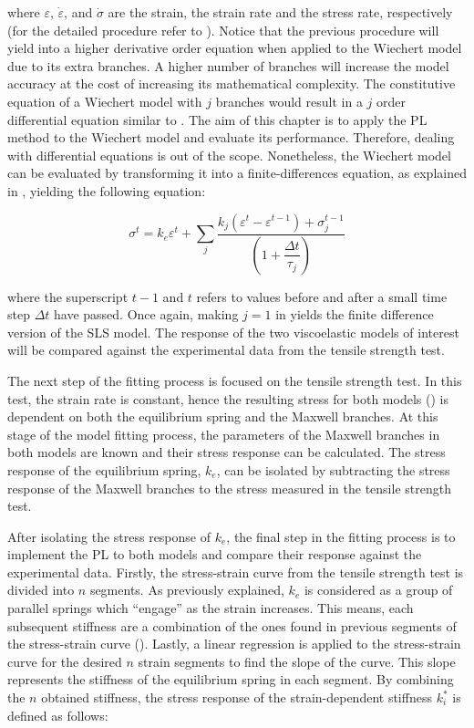 \noindent where $\varepsilon$, $\dot{\varepsilon}$, and $\dot{\sigma}$ are the strain, the strain rate and the stress rate, respectively (for the detailed procedure refer to \cite{roylance2001engineering}). Notice that the previous procedure will yield into a higher derivative order equation when applied to the Wiechert model due to its extra branches. A higher number of branches will increase the model accuracy at the cost of increasing its mathematical complexity. The constitutive equation of a Wiechert model with $j$ branches would result in a $j$ order differential equation similar to . The aim of this chapter is to apply the PL method to the Wiechert model and evaluate its performance. Therefore, dealing with differential equations is out of the scope. Nonetheless, the Wiechert model can be evaluated by transforming it into a finite-differences equation, as explained in \cite{roylance2001engineering}, yielding the following equation:

\begin{equation}
    \label{eq4}
    \sigma^t = k_e\varepsilon^t + \sum_j \frac{k_j(\varepsilon^t - \varepsilon^{t-1}) + \sigma_j^{t-1}}{ \left( 1+\dfrac{\Delta t}{\tau_j} \right) }
\end{equation}

\noindent where the superscript $t-1$ and $t$ refers to values before and after a small time step $\Delta t$ have passed. Once again, making $j=1$ in  yields the finite difference version of the SLS model. The response of the two viscoelastic models of interest will be compared against the experimental data from the tensile strength test.

The next step of the fitting process is focused on the tensile strength test. In this test, the strain rate is constant, hence the resulting stress for both models () is dependent on both the equilibrium spring and the Maxwell branches. At this stage of the model fitting process, the parameters of the Maxwell branches in both models are known and their stress response can be calculated. The stress response of the equilibrium spring, $k_e$, can be isolated by subtracting the stress response of the Maxwell branches to the stress measured in the tensile strength test. 

After isolating the stress response of $k_e$, the final step in the fitting process is to implement the PL to both models and compare their response against the experimental data. Firstly, the stress-strain curve from the tensile strength test is divided into $n$ segments. As previously explained, $k_e$ is considered as a group of parallel springs which ``engage'' as the strain increases. This means, each subsequent stiffness are a combination of the ones found in previous segments of the stress-strain curve ().  Lastly, a linear regression is applied to the stress-strain curve for the desired $n$ strain segments to find the slope of the curve. This slope represents the stiffness of the equilibrium spring in each segment. By combining the $n$ obtained stiffness, the stress response of the strain-dependent stiffness $k_i^*$ is defined as follows:

